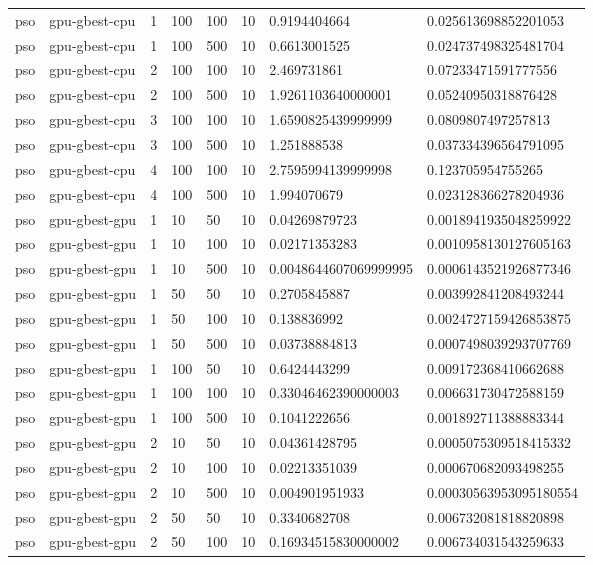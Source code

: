\begin{table}[t]
\begin{tabular}{llllllll}
pso & gpu-gbest-cpu & 1 & 100 & 100 & 10 & 0.9194404664 & 0.025613698852201053 \\
pso & gpu-gbest-cpu & 1 & 100 & 500 & 10 & 0.6613001525 & 0.024737498325481704 \\
pso & gpu-gbest-cpu & 2 & 100 & 100 & 10 & 2.469731861 & 0.07233471591777556 \\
pso & gpu-gbest-cpu & 2 & 100 & 500 & 10 & 1.9261103640000001 & 0.05240950318876428 \\
pso & gpu-gbest-cpu & 3 & 100 & 100 & 10 & 1.6590825439999999 & 0.0809807497257813 \\
pso & gpu-gbest-cpu & 3 & 100 & 500 & 10 & 1.251888538 & 0.037334396564791095 \\
pso & gpu-gbest-cpu & 4 & 100 & 100 & 10 & 2.7595994139999998 & 0.123705954755265 \\
pso & gpu-gbest-cpu & 4 & 100 & 500 & 10 & 1.994070679 & 0.023128366278204936 \\
pso & gpu-gbest-gpu & 1 & 10 & 50 & 10 & 0.04269879723 & 0.0018941935048259922 \\
pso & gpu-gbest-gpu & 1 & 10 & 100 & 10 & 0.02171353283 & 0.0010958130127605163 \\
pso & gpu-gbest-gpu & 1 & 10 & 500 & 10 & 0.0048644607069999995 & 0.0006143521926877346 \\
pso & gpu-gbest-gpu & 1 & 50 & 50 & 10 & 0.2705845887 & 0.003992841208493244 \\
pso & gpu-gbest-gpu & 1 & 50 & 100 & 10 & 0.138836992 & 0.0024727159426853875 \\
pso & gpu-gbest-gpu & 1 & 50 & 500 & 10 & 0.03738884813 & 0.0007498039293707769 \\
pso & gpu-gbest-gpu & 1 & 100 & 50 & 10 & 0.6424443299 & 0.009172368410662688 \\
pso & gpu-gbest-gpu & 1 & 100 & 100 & 10 & 0.33046462390000003 & 0.006631730472588159 \\
pso & gpu-gbest-gpu & 1 & 100 & 500 & 10 & 0.1041222656 & 0.001892711388883344 \\
pso & gpu-gbest-gpu & 2 & 10 & 50 & 10 & 0.04361428795 & 0.0005075309518415332 \\
pso & gpu-gbest-gpu & 2 & 10 & 100 & 10 & 0.02213351039 & 0.000670682093498255 \\
pso & gpu-gbest-gpu & 2 & 10 & 500 & 10 & 0.004901951933 & 0.00030563953095180554 \\
pso & gpu-gbest-gpu & 2 & 50 & 50 & 10 & 0.3340682708 & 0.006732081818820898 \\
pso & gpu-gbest-gpu & 2 & 50 & 100 & 10 & 0.16934515830000002 & 0.006734031543259633 \\

\end{tabular}
\end{table}
